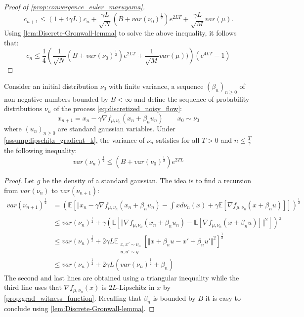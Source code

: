 \begin{proof}[Proof of \cref{prop:convergence_euler_maruyama}]
\[
c_{n+1}\leq(1+4\gamma L)c_{n}+\frac{\gamma L}{\sqrt{N}}(B+var(\nu_{0})^{\frac{1}{2}})e^{2LT}+\frac{\gamma L}{\sqrt{M}}var(\mu).
\]
Using \cref{lem:Discrete-Gronwall-lemma} to solve the above inequality, it follows that:
\[
c_{n}\leq\frac{1}{4}\left(\frac{1}{\sqrt{N}}(B+var(\nu_{0})^{\frac{1}{2}})e^{2LT}+\frac{1}{\sqrt{M}}var(\mu))\right)(e^{4LT}-1)
\]
\end{proof}



%
\begin{lemma}\label{lem:Control_variance}
Consider an initial distribution
$\nu_{0}$ with finite variance, a sequence $(\beta_n)_{ n \geq 0}$ of non-negative numbers bounded by $B<\infty$ and define the sequence of probability distributions $\nu_n$ of the process \cref{eq:discretized_noisy_flow}:
\[
x_{n+1}=x_{n}-\gamma\nabla f_{\mu,\nu_{n}}(x_{n}+\beta_{n}u_{n}) \qquad x_0 \sim \nu_0
\]
where $(u_n)_{n\geq 0}$ are standard gaussian variables. 
Under \cref{assump:lipschitz_gradient_k},  the variance of
$\nu_{n}$ satisfies for all $T>0$ and $n\leq\frac{T}{\gamma}$ the following inequality:
\[
var(\nu_{n})^{\frac{1}{2}}\leq(B+var(\nu_{0})^{\frac{1}{2}})e^{2TL}
\]
\end{lemma}
%
\begin{proof}
Let $g$ be the density of a standard gaussian. The idea is to find a recursion from $var(\nu_{n})$ to $var(\nu_{n+1})$:
\begin{align*}
var(\nu_{n+1})^{\frac{1}{2}} 
 & =(\mathbb{E}[\Vert x_{n}-\gamma\nabla f_{\mu,\nu_{n}}(x_{n}+\beta_{n}u_{n})-\int xd\nu_{n}(x)+\gamma\mathbb{E}[\nabla f_{\mu,\nu_{n}}(x+\beta_{n}u)]])^{\frac{1}{2}}\\
 & \leq var(\nu_{n})^{\frac{1}{2}}+\gamma(\mathbb{E}[\Vert\nabla f_{\mu,\nu_{n}}(x_{n}+\beta_{n}u_{n})-\mathbb{E}[\nabla f_{\mu,\nu_{n}}(x+\beta_{n}u)]\Vert^{2}])^{\frac{1}{2}}\\
 & \leq var(\nu_{n})^{\frac{1}{2}}+2\gamma L\mathbb{E}_{\substack{x,x'\sim\nu_{n}\\ u,u'\sim g}}[\Vert x+\beta_{n}u-x'+\beta_{n}u'\Vert^{2}]^{\frac{1}{2}}\\
 & \leq var(\nu_{n})^{\frac{1}{2}}+2\gamma L(var(\nu_{n})^{\frac{1}{2}}+\beta_{n})
\end{align*}
The second and last lines are obtained using a triangular inequality while the third line uses that $\nabla f_{\mu,\nu_n}(x)$ is $2L$-Lipschitz in $x$ by  \cref{prop:grad_witness_function}. Recalling that $\beta_{n}$ is bounded by $B$ it is easy to conclude using \cref{lem:Discrete-Gronwall-lemma}. 
\end{proof}


